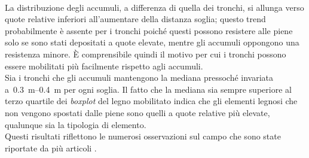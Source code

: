 %
\\
La distribuzione degli accumuli, a differenza di quella dei tronchi, si allunga verso quote relative inferiori all'aumentare della distanza soglia; questo trend probabilmente è assente per i tronchi poiché questi possono resistere alle piene solo se sono stati depositati a quote elevate, mentre gli accumuli oppongono una resistenza minore.
È comprensibile quindi il motivo per cui i tronchi possono essere mobilitati più facilmente rispetto agli accumuli.
\\
Sia i tronchi che gli accumuli mantengono la mediana pressoché invariata a~\SIrange[range-phrase = {-}, range-units = single]{0.3}{0.4}{\m} per ogni soglia.
Il fatto che la mediana sia sempre superiore al terzo quartile dei \emph{boxplot} del legno mobilitato indica che gli elementi legnosi che non vengono spostati dalle piene sono quelli a quote relative più elevate, qualunque sia la tipologia di elemento.
\\
Questi risultati riflettono le numerosi osservazioni sul campo che sono state riportate da più articoli .

